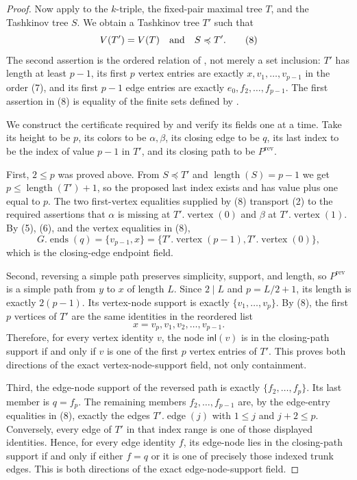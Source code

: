 \begin{proof}
Now apply  to the $k$-triple, the
fixed-pair maximal tree $T$, and the Tashkinov tree $S$.  We obtain a
Tashkinov tree $T'$ such that
\[
 V(T')=V(T)\quad\hbox{and}\quad S\preccurlyeq T'.
\tag{8}
\]
The second assertion is the ordered relation of
, not merely a set inclusion: $T'$ has
length at least $p-1$, its first $p$ vertex entries are exactly
$x,v_1,\ldots,v_{p-1}$ in the order (7), and its first $p-1$ edge entries
are exactly $e_0,f_2,\ldots,f_{p-1}$.  The first assertion in (8) is
equality of the finite sets defined by
.

We construct the certificate required by
 and verify its fields one at a time.
Take its height to be $p$, its colors to be $\alpha,\beta$, its closing
edge to be $q$, its last index to be the index of value $p-1$ in $T'$, and
its closing path to be $P^{\mathrm{rev}}$.

First, $2\le p$ was proved above.  From $S\preccurlyeq T'$ and
$\operatorname{length}(S)=p-1$ we get
$p\le\operatorname{length}(T')+1$, so the proposed last index exists and
has value plus one equal to $p$.  The two first-vertex equalities supplied
by (8) transport (2) to the required assertions that $\alpha$ is missing
at $T'.\operatorname{vertex}(0)$ and $\beta$ at
$T'.\operatorname{vertex}(1)$.  By (5), (6), and the vertex equalities in
(8),
\[
 G.\operatorname{ends}(q)
 =\{v_{p-1},x\}
 =\{T'.\operatorname{vertex}(p-1),T'.\operatorname{vertex}(0)\},
\]
which is the closing-edge endpoint field.

Second, reversing a simple path preserves simplicity, support, and length,
so $P^{\mathrm{rev}}$ is a simple path from $y$ to $x$ of length $L$.
Since $2\mid L$ and $p=L/2+1$, its length is exactly $2(p-1)$.  Its
vertex-node support is exactly $\{v_1,\ldots,v_p\}$.  By (8), the first
$p$ vertices of $T'$ are the same identities in the reordered list
\[
 x=v_p,v_1,v_2,\ldots,v_{p-1}.
\]
Therefore, for every vertex identity $v$, the node $\mathsf{inl}(v)$ is
in the closing-path support if and only if $v$ is one of the first $p$
vertex entries of $T'$.  This proves both directions of the exact
vertex-node-support field, not only containment.

Third, the edge-node support of the reversed path is exactly
$\{f_2,\ldots,f_p\}$.  Its last member is $q=f_p$.  The remaining members
$f_2,\ldots,f_{p-1}$ are, by the edge-entry equalities in (8), exactly the
edges $T'.\operatorname{edge}(j)$ with
$1\le j$ and $j+2\le p$.  Conversely, every edge of $T'$ in that index
range is one of those displayed identities.  Hence, for every edge
identity $f$, its edge-node lies in the closing-path support if and only if
either $f=q$ or it is one of precisely those indexed trunk edges.  This is
both directions of the exact edge-node-support field.


\end{proof}
